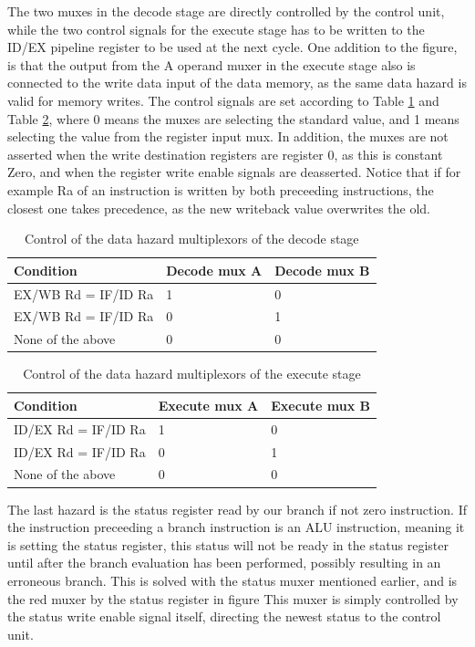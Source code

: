 \documentclass[11pt]{report}
\begin{document}
The two muxes in the
decode stage are directly controlled by the control unit, while the two control signals 
for the execute stage has to be written to the ID/EX pipeline register to be used at the
next cycle. One addition to the figure, is that the output from the A operand muxer in 
the execute stage also is connected to the write data input of the data memory, as the
same data hazard is valid for memory writes. The control signals are set according to
Table \ref{tab:demuxes} and Table \ref{tab:exmuxes}, 
where 0 means the muxes are selecting the standard value, and 1 means selecting the 
value from the register input mux. In addition, the muxes are not asserted when 
the write destination registers are register 0, 
as this is constant Zero, and when the register write enable signals are deasserted.
Notice that if for example Ra of an instruction is written by both preceeding 
instructions, the closest one takes precedence, as the new writeback value overwrites
the old.

\begin{table}[htbp]
  \centering
  \begin{tabular}{|l|l|l|}
    \hline
    Condition&Decode mux A&Decode mux B \\
    \hline
    EX/WB Rd = IF/ID Ra	&1	& 0\\
    EX/WB Rd = IF/ID Ra	&0	& 1\\
    None of the above	&0	& 0\\
    \hline
    
  \end{tabular}
  \caption{Control of the data hazard multiplexors of the decode stage}
  \label{tab:demuxes}
\end{table}

\begin{table}[htbp]
  \centering
  \begin{tabular}{|l|l|l|}
    \hline
    Condition&Execute mux A&Execute mux B \\
    \hline
    ID/EX Rd = IF/ID Ra	&1	& 0\\
    ID/EX Rd = IF/ID Ra	&0	& 1\\
    None of the above	&0	& 0\\
    \hline
    
  \end{tabular}
  \caption{Control of the data hazard multiplexors of the execute stage}
  \label{tab:exmuxes}
\end{table}
The last hazard is the status register read by our branch if not zero instruction.
If the instruction preceeding a branch instruction is an ALU instruction, meaning it
is setting the status register, this status will not be ready in the status register
until after the branch evaluation has been performed, possibly resulting in an
erroneous branch. This is solved with the status muxer mentioned earlier, and is the 
red muxer by the status register in figure %
This muxer is simply controlled by the status write enable signal itself, directing the
newest status to the control unit.
\end{document}
